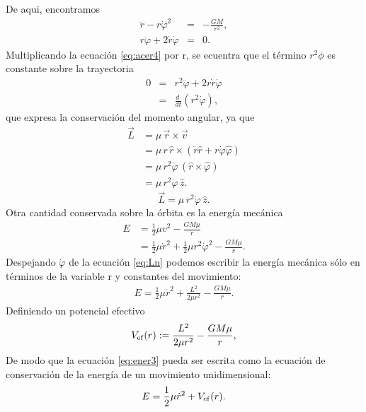 De aqui, encontramos 
\begin{eqnarray}
    \ddot{r}-r\dot{\varphi}^2&=&-\frac{GM}{r^2},\label{eq:acer3}\\
    r\ddot{\varphi}+2\dot{r}\dot{\varphi}&=&0.\label{eq:acer4}
\end{eqnarray}
Multiplicando la ecuación \ref{eq:acer4} por r, se ecuentra que el término $r^2\phi$ es constante sobre la trayectoria
\begin{eqnarray*}
    0&=&r^2\ddot{\varphi}+2r\dot{r}\dot{\varphi}\\
    &=&\frac{d\ }{dt}\left(r^2\dot{\varphi}\right),
\end{eqnarray*}
que expresa la conservación del momento angular, ya que
\begin{align*}
    \vec{L} & = \mu\,\vec{r}\times\vec{v}\\
    & = \mu\,r\,\hat{r}\times\left(\dot{r}\hat{r}+r\dot{\varphi}\hat{\varphi}
    \right)\\
    & = \mu\,r^2\dot{\varphi}\,(\hat{r}\times\hat{\varphi})\\
    & = \mu\,r^2\dot{\varphi}\,\hat{z}.
    \end{align*}
\begin{equation}
    \vec{L} = \mu\,r^2\dot{\varphi}\,\hat{z}. \label{eq:Ln}
\end{equation}
Otra cantidad conservada sobre la órbita es la energía mecánica
\begin{align}
    E&=\frac{1}{2}\mu v^2-\frac{GM\mu}{r} \label{eq:ener1}\\
    &=\frac{1}{2}\mu\dot{r}^2+\frac{1}{2}\mu r^2\dot{\varphi}^2-\frac{GM\mu}{r}.\label{eq:ener2}
\end{align}
Despejando $\dot{\varphi}$ de la ecuación \ref{eq:Ln} podemos escribir la energía mecánica sólo en términos de la variable r y constantes del movimiento:
\begin{eqnarray}
    E=\frac{1}{2}\mu\dot{r}^2+\frac{L^2}{2\mu r^2}-\frac{GM\mu}{r} .\label{eq:ener3}
\end{eqnarray}
Definiendo un potencial efectivo
\begin{equation}
    V_{\rm ef}(r):=\frac{L^2}{2\mu r^2}-\frac{GM\mu}{r},
\end{equation}
De modo que la ecuación \ref{eq:ener3} pueda ser escrita como la ecuación de conservación de la energía de un movimiento unidimensional:
\begin{equation}
    E=\frac{1}{2}\mu\dot{r}^2+V_{\rm ef}(r) . \label{eq:EVef}
\end{equation}
